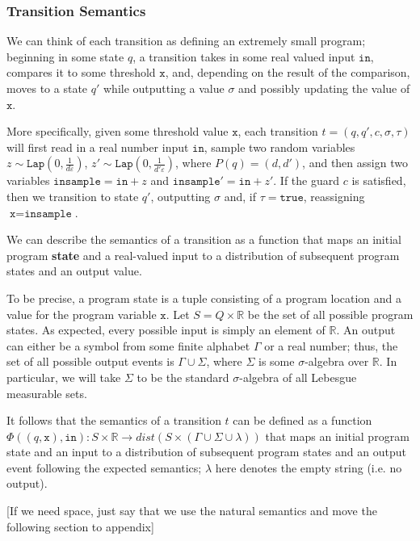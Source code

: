 \documentclass[12pt]{article}
\newcommand{\RR}{\mathbb{R}}
\newcommand{\Lap}{\texttt{Lap}}
\theoremstyle{definition}
\begin{document}
\subsubsection{Transition Semantics}

We can think of each transition as defining an extremely small program; beginning in some state $q$, a transition takes in some real valued input $\texttt{in}$, compares it to some threshold $\texttt{x}$, and, depending on the result of the comparison, moves to a state $q'$ while outputting a value $\sigma$ and possibly updating the value of $\texttt{x}$.

More specifically, given some threshold value $\texttt{x}$, each transition $t = (q, q', c, \sigma, \tau)$ will first read in a real number input $\texttt{in}$, sample two random variables $z\sim\Lap(0, \frac{1}{d\varepsilon})$, $z'\sim\Lap(0, \frac{1}{d'\varepsilon})$, where $P(q) = (d, d')$, and then assign two variables $\texttt{insample} = \texttt{in} + z$ and $\texttt{insample}' = \texttt{in} + z'$. 
If the guard $c$ is satisfied, then we transition to state $q'$, outputting $\sigma$ and, if $\tau = \texttt{true}$, reassigning $\texttt{x} = \texttt{insample}$. 

We can describe the semantics of a transition as a function that maps an initial program \textbf{state} and a real-valued input to a distribution of subsequent program states and an output value. 

To be precise, a program state is a tuple consisting of a program location and a value for the program variable $\texttt{x}$. Let $S = Q\times\RR$ be the set of all possible program states. As expected, every possible input is simply an element of $\RR$. 
An output can either be a symbol from some finite alphabet $\Gamma$ or a real number; thus, the set of all possible output events is $\Gamma \cup \Sigma$, where $\Sigma$ is some $\sigma$-algebra over $\RR$.
In particular, we will take $\Sigma$ to be the standard $\sigma$-algebra of all Lebesgue measurable sets. 

It follows that the semantics of a transition $t$ can be defined as a function $\Phi((q, \texttt{x}), \texttt{in}): S\times \RR\to dist(S\times (\Gamma\cup\Sigma\cup \lambda))$ that maps an initial program state and an input to a distribution of subsequent program states and an output event following the expected semantics; $\lambda$ here denotes the empty string (i.e. no output). 

{\color{red}[If we need space, just say that we use the natural semantics and move the following section to appendix]}
\end{document}
